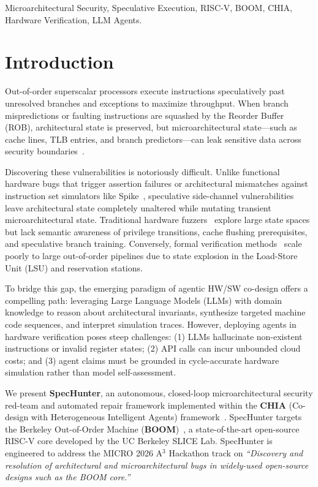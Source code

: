 \documentclass[conference,10pt]{IEEEtran}
\begin{document}
\begin{IEEEkeywords}
Microarchitectural Security, Speculative Execution, RISC-V, BOOM, CHIA, Hardware Verification, LLM Agents.
\end{IEEEkeywords}

\section{Introduction}
Out-of-order superscalar processors execute instructions speculatively past unresolved branches and exceptions to maximize throughput. When branch mispredictions or faulting instructions are squashed by the Reorder Buffer (ROB), architectural state is preserved, but microarchitectural state---such as cache lines, TLB entries, and branch predictors---can leak sensitive data across security boundaries~\cite{spectre, meltdown, boom}.

Discovering these vulnerabilities is notoriously difficult. Unlike functional hardware bugs that trigger assertion failures or architectural mismatches against instruction set simulators like Spike~\cite{spike}, speculative side-channel vulnerabilities leave architectural state completely unaltered while mutating transient microarchitectural state. Traditional hardware fuzzers~\cite{rfuzz, difuzz} explore large state spaces but lack semantic awareness of privilege transitions, cache flushing prerequisites, and speculative branch training. Conversely, formal verification methods~\cite{secfuzz, transientformal} scale poorly to large out-of-order pipelines due to state explosion in the Load-Store Unit (LSU) and reservation stations.

To bridge this gap, the emerging paradigm of agentic HW/SW co-design offers a compelling path: leveraging Large Language Models (LLMs) with domain knowledge to reason about architectural invariants, synthesize targeted machine code sequences, and interpret simulation traces. However, deploying agents in hardware verification poses steep challenges: (1) LLMs hallucinate non-existent instructions or invalid register states; (2) API calls can incur unbounded cloud costs; and (3) agent claims must be grounded in cycle-accurate hardware simulation rather than model self-assessment.

We present \textbf{SpecHunter}, an autonomous, closed-loop microarchitectural security red-team and automated repair framework implemented within the \textbf{CHIA} (Co-design with Heterogeneous Intelligent Agents) framework~\cite{chia}. SpecHunter targets the Berkeley Out-of-Order Machine (\textbf{BOOM})~\cite{boom}, a state-of-the-art open-source RISC-V core developed by the UC Berkeley SLICE Lab. SpecHunter is engineered to address the MICRO 2026 A$^3$ Hackathon track on \textit{``Discovery and resolution of architectural and microarchitectural bugs in widely-used open-source designs such as the BOOM core.''}
\end{document}
